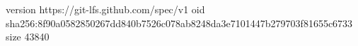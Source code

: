 version https://git-lfs.github.com/spec/v1
oid sha256:8f90a0582850267dd840b7526c078ab8248da3e7101447b279703f81655c6733
size 43840
